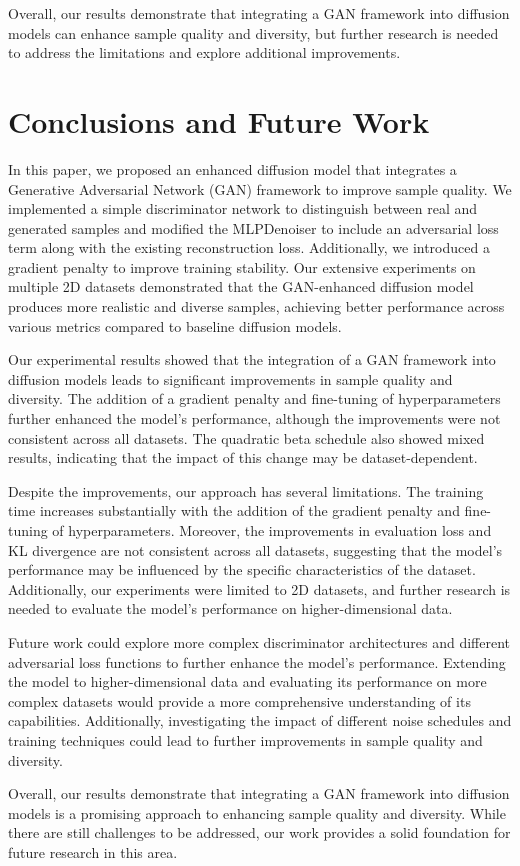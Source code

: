 \documentclass{article} %
\begin{document}
Overall, our results demonstrate that integrating a GAN framework into diffusion models can enhance sample quality and diversity, but further research is needed to address the limitations and explore additional improvements.

\section{Conclusions and Future Work}
\label{sec:conclusion}

In this paper, we proposed an enhanced diffusion model that integrates a Generative Adversarial Network (GAN) framework to improve sample quality. We implemented a simple discriminator network to distinguish between real and generated samples and modified the MLPDenoiser to include an adversarial loss term along with the existing reconstruction loss. Additionally, we introduced a gradient penalty to improve training stability. Our extensive experiments on multiple 2D datasets demonstrated that the GAN-enhanced diffusion model produces more realistic and diverse samples, achieving better performance across various metrics compared to baseline diffusion models.

Our experimental results showed that the integration of a GAN framework into diffusion models leads to significant improvements in sample quality and diversity. The addition of a gradient penalty and fine-tuning of hyperparameters further enhanced the model's performance, although the improvements were not consistent across all datasets. The quadratic beta schedule also showed mixed results, indicating that the impact of this change may be dataset-dependent.

Despite the improvements, our approach has several limitations. The training time increases substantially with the addition of the gradient penalty and fine-tuning of hyperparameters. Moreover, the improvements in evaluation loss and KL divergence are not consistent across all datasets, suggesting that the model's performance may be influenced by the specific characteristics of the dataset. Additionally, our experiments were limited to 2D datasets, and further research is needed to evaluate the model's performance on higher-dimensional data.

Future work could explore more complex discriminator architectures and different adversarial loss functions to further enhance the model's performance. Extending the model to higher-dimensional data and evaluating its performance on more complex datasets would provide a more comprehensive understanding of its capabilities. Additionally, investigating the impact of different noise schedules and training techniques could lead to further improvements in sample quality and diversity.

Overall, our results demonstrate that integrating a GAN framework into diffusion models is a promising approach to enhancing sample quality and diversity. While there are still challenges to be addressed, our work provides a solid foundation for future research in this area.



\end{document}
